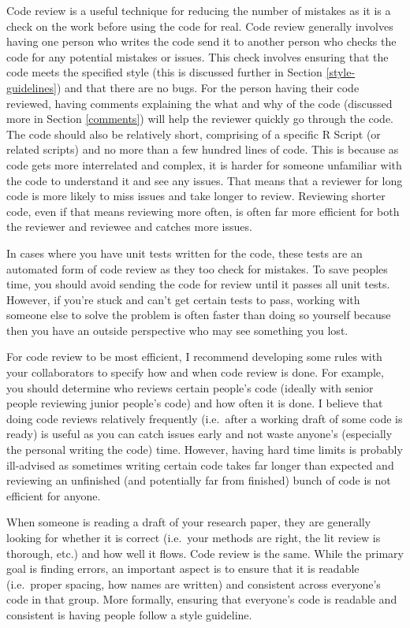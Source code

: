 \documentclass[
  12pt,
  openany]{book}
\begin{document}
Code review is a useful technique for reducing the number of mistakes as it is a check on the work before using the code for real. Code review generally involves having one person who writes the code send it to another person who checks the code for any potential mistakes or issues. This check involves ensuring that the code meets the specified style (this is discussed further in Section \ref{style-guidelines}) and that there are no bugs. For the person having their code reviewed, having comments explaining the what and why of the code (discussed more in Section \ref{comments}) will help the reviewer quickly go through the code. The code should also be relatively short, comprising of a specific R Script (or related scripts) and no more than a few hundred lines of code. This is because as code gets more interrelated and complex, it is harder for someone unfamiliar with the code to understand it and see any issues. That means that a reviewer for long code is more likely to miss issues and take longer to review. Reviewing shorter code, even if that means reviewing more often, is often far more efficient for both the reviewer and reviewee and catches more issues.

In cases where you have unit tests written for the code, these tests are an automated form of code review as they too check for mistakes. To save peoples time, you should avoid sending the code for review until it passes all unit tests. However, if you're stuck and can't get certain tests to pass, working with someone else to solve the problem is often faster than doing so yourself because then you have an outside perspective who may see something you lost.

For code review to be most efficient, I recommend developing some rules with your collaborators to specify how and when code review is done. For example, you should determine who reviews certain people's code (ideally with senior people reviewing junior people's code) and how often it is done. I believe that doing code reviews relatively frequently (i.e.~after a working draft of some code is ready) is useful as you can catch issues early and not waste anyone's (especially the personal writing the code) time. However, having hard time limits is probably ill-advised as sometimes writing certain code takes far longer than expected and reviewing an unfinished (and potentially far from finished) bunch of code is not efficient for anyone.

When someone is reading a draft of your research paper, they are generally looking for whether it is correct (i.e.~your methods are right, the lit review is thorough, etc.) and how well it flows. Code review is the same. While the primary goal is finding errors, an important aspect is to ensure that it is readable (i.e.~proper spacing, how names are written) and consistent across everyone's code in that group. More formally, ensuring that everyone's code is readable and consistent is having people follow a style guideline.
\end{document}
